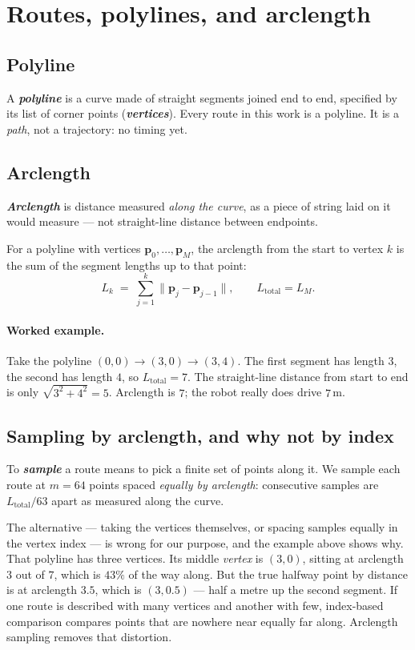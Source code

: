 \documentclass[11pt,a4paper]{article}
\newcommand{\defn}[1]{\textbf{\textit{#1}}}
\begin{document}
\section{Routes, polylines, and arclength}

\subsection{Polyline}

A \defn{polyline} is a curve made of straight segments joined end to end, specified by its
list of corner points (\defn{vertices}). Every route in this work is a polyline. It is a
\emph{path}, not a trajectory: no timing yet.

\subsection{Arclength}

\defn{Arclength} is distance measured \emph{along the curve}, as a piece of string laid on
it would measure --- not straight-line distance between endpoints.

For a polyline with vertices $\mathbf{p}_0, \dots, \mathbf{p}_M$, the arclength from the
start to vertex $k$ is the sum of the segment lengths up to that point:
\[
L_k \;=\; \sum_{j=1}^{k} \|\mathbf{p}_j - \mathbf{p}_{j-1}\|,
\qquad L_{\mathrm{total}} = L_M .
\]

\paragraph{Worked example.} Take the polyline $(0,0) \to (3,0) \to (3,4)$. The first
segment has length $3$, the second has length $4$, so $L_{\mathrm{total}} = 7$. The
straight-line distance from start to end is only $\sqrt{3^2+4^2} = 5$. Arclength is $7$; the
robot really does drive $7$\,m.

\subsection{Sampling by arclength, and why not by index}

To \defn{sample} a route means to pick a finite set of points along it. We sample each route
at $m = 64$ points spaced \emph{equally by arclength}: consecutive samples are
$L_{\mathrm{total}}/63$ apart as measured along the curve.

The alternative --- taking the vertices themselves, or spacing samples equally in the
vertex index --- is wrong for our purpose, and the example above shows why. That polyline
has three vertices. Its middle \emph{vertex} is $(3,0)$, sitting at arclength $3$ out of
$7$, which is $43\%$ of the way along. But the true halfway point by distance is at
arclength $3.5$, which is $(3, 0.5)$ --- half a metre up the second segment. If one route
is described with many vertices and another with few, index-based comparison compares
points that are nowhere near equally far along. Arclength sampling removes that
distortion.
\end{document}
